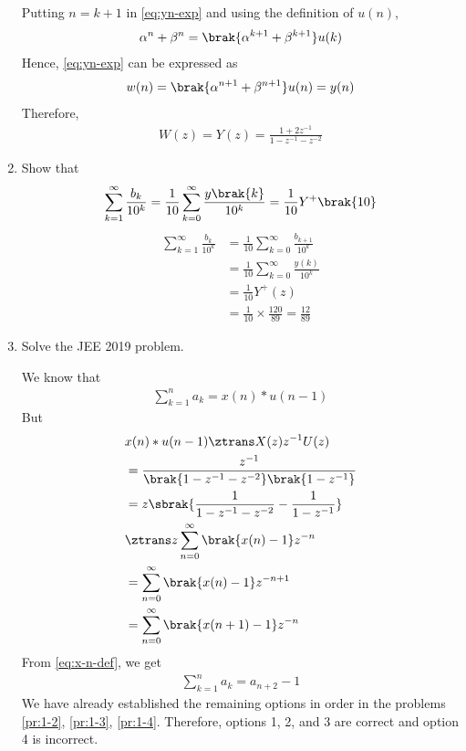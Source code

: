 \documentclass[journal,12pt,twocolumn]{IEEEtran}
\renewcommand\thesection{\arabic{section}}
\begin{document}
\begin{enumerate}[label=\thesection.\arabic*,ref=\thesection.\theenumi]
\solution Putting $n = k + 1$ in \eqref{eq:yn-exp} and using the definition of $u(n)$, 
\begin{align}
\alpha^n + \beta^n = \brak{\alpha^{k + 1} + \beta^{k + 1}}u(k)
\end{align}
Hence, \eqref{eq:yn-exp} can be expressed as
\begin{align}
w(n) = \brak{\alpha^{n+1} + \beta^{n+1}}u(n) = y(n)
\end{align}
Therefore,
\begin{align}
    W(z) = Y(z) = \frac{1 + 2z^{-1}}{1 - z^{-1} - z^{-2}}
\end{align}
 \item Show that 
\begin{align}
	\sum_{k=1}^{\infty}\frac{b_k}{10^k} =
	\frac{1}{10}\sum_{k=0}^{\infty}\frac{y\brak{k}}{10^k} =\frac{1}{10}Y^{+}\brak{{10}}
\end{align}
\label{pr:1-4}
\solution
\begin{align}
    \sum_{k=1}^{\infty}\frac{b_k}{10^k} &= \frac{1}{10}\sum_{k = 0}^{\infty}\frac{b_{k+1}}{10^k} \\
                                        &= \frac{1}{10}\sum_{k = 0}^{\infty}\frac{y(k)}{10^k} \\
                                        &= \frac{1}{10}Y^+(z) \\
                                        &= \frac{1}{10}\times\frac{120}{89} = \frac{12}{89}
\end{align}
\item Solve the JEE 2019 problem.

\solution We know that
\begin{align}
    \sum_{k = 1}^{n}a_k = x(n)*u(n - 1)
\end{align}
But
\begin{align}
    &x(n)*u(n - 1) \ztrans X(z)z^{-1}U(z) \\
    &= \frac{z^{-1}}{\brak{1 - z^{-1} - z^{-2}}\brak{1 - z^{-1}}} \\
    &= z\sbrak{\frac{1}{1 - z^{-1} - z^{-2}} - \frac{1}{1 - z^{-1}}} \\
    &\ztrans z\sum_{n = 0}^{\infty}\brak{x(n) - 1}z^{-n} \\
    &= \sum_{n = 0}^{\infty}\brak{x(n) - 1}z^{-n + 1} \\
    &= \sum_{n = 0}^{\infty}\brak{x(n + 1) - 1}z^{-n} \\
\end{align}
From \eqref{eq:x-n-def}, we get
\begin{align}
    \sum_{k = 1}^{n}a_k = a_{n+2} - 1
\end{align}
We have already established the remaining options in order in the problems
\eqref{pr:1-2}, \eqref{pr:1-3}, \eqref{pr:1-4}. Therefore, options 1, 2,
and 3 are correct and option 4 is incorrect.
\end{enumerate}
\end{document}
